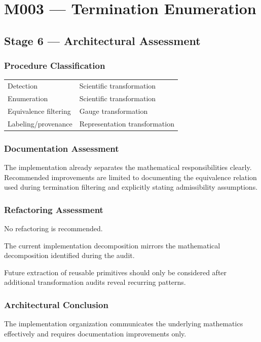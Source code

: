 \chapter{M003 --- Termination Enumeration}

\section{Stage 6 --- Architectural Assessment}

\subsection{Procedure Classification}

\begin{tabular}{|l|l|}
\hline
Detection & Scientific transformation\\
Enumeration & Scientific transformation\\
Equivalence filtering & Gauge transformation\\
Labeling/provenance & Representation transformation\\
\hline
\end{tabular}

\subsection{Documentation Assessment}

The implementation already separates the mathematical responsibilities
clearly. Recommended improvements are limited to documenting the
equivalence relation used during termination filtering and explicitly
stating admissibility assumptions.

\subsection{Refactoring Assessment}

No refactoring is recommended.

The current implementation decomposition mirrors the mathematical
decomposition identified during the audit.

Future extraction of reusable primitives should only be considered after
additional transformation audits reveal recurring patterns.

\subsection{Architectural Conclusion}

The implementation organization communicates the underlying mathematics
effectively and requires documentation improvements only.
